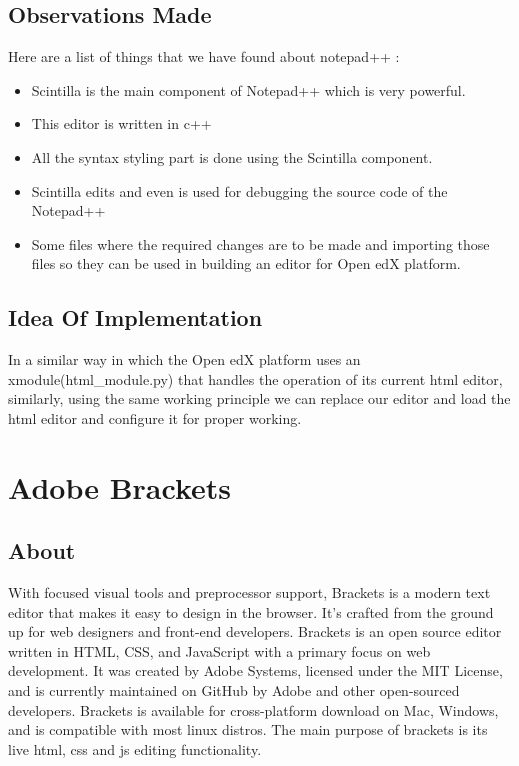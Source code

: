 \subsection{Observations Made} 
Here are a list of things that we have found about notepad++ : 
\begin{itemize}
\item Scintilla is the main component of Notepad++ which is very powerful.
\item This editor is written in c++
\item All the syntax styling part is done using the Scintilla component.
\item Scintilla edits and even is used for debugging the source code of the Notepad++
\item Some files where the required changes are to be made and importing those files so they can
be used in building an editor for Open edX platform. \newline
\end{itemize}  

\subsection{Idea Of Implementation }
In a similar way in which the Open edX platform uses an xmodule(html\_module.py) that
handles the operation of its current html editor, similarly, using the same working principle
we can replace our editor and load the html editor and configure it for proper working.  
\section{Adobe Brackets}
\subsection{About}
With focused visual tools and preprocessor support, Brackets is a modern text editor that
makes it easy to design in the browser. It's crafted from the ground up for web designers and
front-end developers. \newline 
Brackets is an open source editor written in HTML, CSS, and JavaScript with a primary
focus on web development. It was created by Adobe Systems, licensed under the MIT
License, and is currently maintained on GitHub by Adobe and other open-sourced
developers. Brackets is available for cross-platform download on Mac, Windows, and is
compatible with most linux distros. The main purpose of brackets is its live html, css and js
editing functionality.
